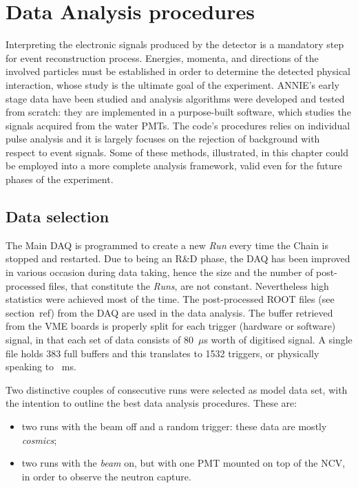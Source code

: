 
\chapter{Data Analysis procedures}
\label{cha:4}

 Interpreting the electronic signals produced by the detector is a mandatory step for event reconstruction %
 process.
 Energies, momenta, and directions of the involved particles must be established in order to determine %
 the detected physical interaction, whose study is the ultimate goal of the experiment.
 ANNIE's early stage data have been studied and analysis algorithms were developed and tested from scratch: %
 they are implemented in a purpose-built software, which studies the signals acquired from the water PMTs.
 The code's procedures relies on individual pulse analysis and it is largely focuses on the rejection of %
 background with respect to event signals.
 Some of these methods, illustrated, in this chapter could be employed into a more complete analysis %
 framework, valid even for the future phases of the experiment.

\section{Data selection}

 The Main DAQ is programmed to create a new \emph{Run} every time the Chain is stopped and restarted.
 Due to being an R\&D phase, the DAQ has been improved in various occasion during data taking, %
 hence the size and the number of post-processed files, that constitute the \emph{Runs}, are not constant.
 Nevertheless high statistics were achieved most of the time.
 The post-processed ROOT files (see section~ref) from the DAQ are used in the data analysis.
 The buffer retrieved from the VME boards is properly split for each trigger (hardware or software) signal, %
 in that each set of data consists of 80~$\mu$s worth of digitised signal.
 A single file holds 383 full buffers and this translates to 1532 triggers, or physically speaking to ~ms.

 Two distinctive couples of consecutive runs were selected as model data set, with the intention to %
 outline the best data analysis procedures.
 These are:
\begin{itemize}
  \item two runs with the beam off and a random trigger: these data are mostly \emph{cosmics};
  \item two runs with the \emph{beam} on, but with one PMT mounted on top of the NCV, in order to %
    observe the neutron capture.
\end{itemize}

